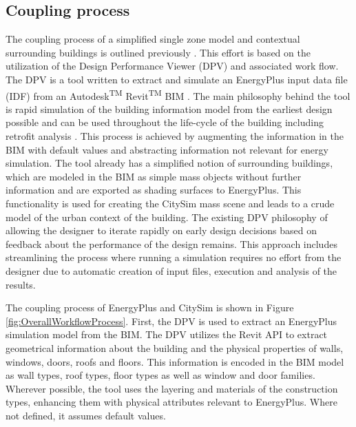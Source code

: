 \documentclass{tBPS2e}
\theoremstyle{plain}
\theoremstyle{definition}
\theoremstyle{remark}
\begin{document}
\subsection{Coupling process}
The coupling process of a simplified single zone model and contextual surrounding buildings is outlined previously \citep{thomas2014multiscale}. This effort is based on the utilization of the Design Performance Viewer (DPV) and associated work flow. The DPV is a tool written to extract and simulate an EnergyPlus input data file (IDF) from an Autodesk\textsuperscript{TM} Revit\textsuperscript{TM} BIM \citep{Schlueter2009}. The main philosophy behind the tool is rapid simulation of the building information model from the earliest design possible and can be used throughout the life-cycle of the building including retrofit analysis \citep{Miller:2014tu}. This process is achieved by augmenting the information in the BIM with default values and abstracting information not relevant for energy simulation. The tool already has a simplified notion of surrounding buildings, which are modeled in the BIM as simple mass objects without further information and are exported as shading surfaces to EnergyPlus. This functionality is used for creating the CitySim mass scene and leads to a crude model of the urban context of the building. The existing DPV philosophy of allowing the designer to iterate rapidly on early design decisions based on feedback about the performance of the design remains. This approach includes streamlining the process where running a simulation requires no effort from the designer due to automatic creation of input files, execution and analysis of the results.

The coupling process of EnergyPlus and CitySim is shown in Figure \ref{fig:OverallWorkflowProcess}. First, the DPV is used to extract an EnergyPlus simulation model from the BIM. The DPV utilizes the Revit API to extract geometrical information about the building and the physical properties of walls, windows, doors, roofs and floors. This information is encoded in the BIM model as wall types, roof types,
floor types as well as window and door families. Wherever possible, the tool uses the layering and materials of the construction types, enhancing them with physical attributes relevant to EnergyPlus. Where not defined, it assumes default values.
\end{document}
